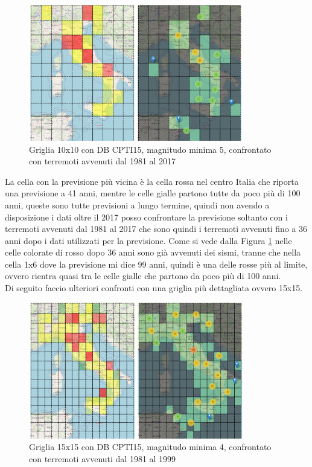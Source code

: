 \begin{figure}[H]
   \centering
   \includegraphics[width=0.835\textwidth]{images/10x10_mag5_confronto_36anniDopo_CPTI15.jpg}
   \caption{Griglia 10x10 con DB CPTI15, magnitudo minima 5, confrontato con terremoti avvenuti dal 1981 al 2017}
   \label{fig:10x10_mag5_36anniDopo}
\end{figure}

La cella con la previsione pi\`u vicina \`e la cella rossa nel centro Italia che riporta una previsione a 41 anni, mentre le celle gialle partono tutte da poco pi\`u di 100 anni, queste sono tutte previsioni a lungo termine, quindi non avendo a disposizione i dati oltre il 2017 posso confrontare la previsione soltanto con i terremoti avvenuti dal 1981 al 2017 che sono quindi i terremoti avvenuti fino a 36 anni dopo i dati utilizzati per la previsione. Come si vede dalla Figura \ref{fig:10x10_mag5_36anniDopo} nelle celle colorate di rosso dopo 36 anni sono gi\`a avvenuti dei sismi, tranne che nella cella 1x6 dove la previsione mi dice 99 anni, quindi \`e una delle rosse pi\`u al limite, ovvero rientra quasi tra le celle gialle che partono da poco pi\`u di 100 anni.\\
Di seguito faccio ulteriori confronti con una griglia pi\`u dettagliata ovvero 15x15.

\begin{figure}[H]
   \centering
   \includegraphics[width=0.835\textwidth]{images/15x15_mag4_confronto_18anniDopo_CPTI15.jpg}
   \caption{Griglia 15x15 con DB CPTI15, magnitudo minima 4, confrontato con terremoti avvenuti dal 1981 al 1999}
   \label{fig:15x15_mag4_18anniDopo}
\end{figure}

